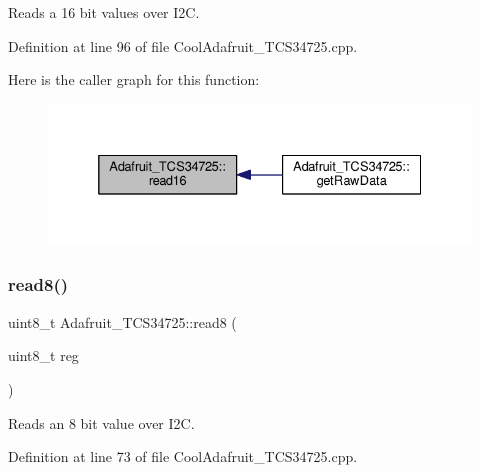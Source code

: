 Reads a 16 bit values over I2C. 



Definition at line 96 of file Cool\+Adafruit\+\_\+\+T\+C\+S34725.\+cpp.

Here is the caller graph for this function\+:
\nopagebreak
\begin{figure}[H]
\begin{center}
\leavevmode
\includegraphics[width=332pt]{class_adafruit___t_c_s34725_a6b9b65ff0f1e57797a1c05a43fd25385_icgraph}
\end{center}
\end{figure}
\mbox{\label{class_adafruit___t_c_s34725_a3ffafbdd475d6baf9abda8dd067b5319}} 
\subsubsection{\texorpdfstring{read8()}{read8()}}
{\footnotesize\ttfamily uint8\+\_\+t Adafruit\+\_\+\+T\+C\+S34725\+::read8 (\begin{DoxyParamCaption}\item[{uint8\+\_\+t}]{reg }\end{DoxyParamCaption})}



Reads an 8 bit value over I2C. 



Definition at line 73 of file Cool\+Adafruit\+\_\+\+T\+C\+S34725.\+cpp.

